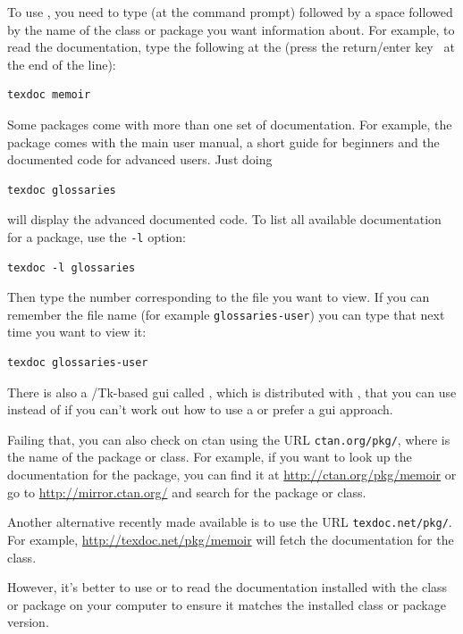To use , you need to
type (at the command prompt)  followed by a space followed by the name of
the class or package you want information about. 
For example, to read the 
documentation, type the following at the  (press the
return/enter key \enter\ at the end of the line):
\begin{verbatim}
texdoc memoir
\end{verbatim}
Some packages come with more than one set of documentation. For
example, the  package comes with the main user
manual, a short guide for beginners and the documented code for
advanced users. Just doing
\begin{verbatim}
texdoc glossaries
\end{verbatim}
will display the advanced documented code. To list all available
documentation for a package, use the \texttt{-l} option:
\begin{verbatim}
texdoc -l glossaries
\end{verbatim}
Then type the number corresponding to the file you want to view. If
you can remember the file name (for example \texttt{glossaries-user}) 
you can type that next time you want to view it:
\begin{verbatim}
texdoc glossaries-user
\end{verbatim}
There is also a /Tk-based \gls{gui} called ,
which is distributed with \reportlinebreak{},
that you can use instead of  if you can't work out
how to use a  or prefer a \gls*{gui} approach.

Failing that, you can also check on \gls{ctan} using the URL
\texttt{ctan.org\slash pkg\slash}, where  is the name of
the package or class. For example, if you want to look up the
documentation for the  package, you can find it at
\url{http://ctan.org/pkg/memoir} or go to
\url{http://mirror.ctan.org/} and search for the package or class.

Another alternative recently made available is to use the URL
\texttt{texdoc.net\slash pkg\slash}. For example, 
\url{http://texdoc.net/pkg/memoir} will 
fetch the documentation for the  class.

However, it's better to use  or  to 
read the documentation installed with the
class or package on your computer to ensure it
matches the installed class or package version.

